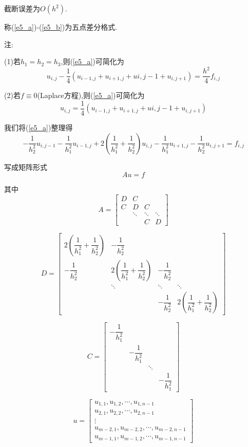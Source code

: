 \documentclass[withoutpreface,bwprint]{cumcmthesis} %
\begin{document}
截断误差为$O(h^2)$.

称(\ref{e5_a})-(\ref{e5_b})为五点差分格式.

注:

(1)若$h_1=h_2=h_3$,则(\ref{e5_a})可简化为
\begin{equation}
\label{e6}
u_{i,j}-\dfrac{1}{4}(u_{i-1,j}+u_{i+1,j}+u{i,j-1}+u_{i,j+1})=\dfrac{h^2}{4}f_{i,j}
\end{equation}

(2)若$f \equiv 0$(Laplace方程),则(\ref{e5_a})可简化为
\begin{equation}
\label{e7}
u_{i,j}=\dfrac{1}{4}(u_{i-1,j}+u_{i+1,j}+u{i,j-1}+u_{i,j+1})
\end{equation}

我们将(\ref{e5_a})整理得
\begin{equation}
\label{e8}
-\dfrac{1}{h_2^2}u_{i,j-1}-\dfrac{1}{h_1^2}u_{i-1,j}+2(\dfrac{1}{h_1^2}+\dfrac{1}{h_2^2})u_{i,j}-\dfrac{1}{h_1^2}u_{i+1,j}-\dfrac{1}{h_2^2}u_{i,j+1}=f_{i,j}
\end{equation}

写成矩阵形式
\begin{equation}
\label{e9}
Au=f
\end{equation}

其中
$$
A=
\begin{bmatrix}
D & C \\
C & D & C \\
& \ddots & \ddots & \ddots \\
& & 	C & D
\end{bmatrix}
$$


$$
D=
\begin{bmatrix}
2(\dfrac{1}{h_1^2}+\dfrac{1}{h_2^2}) & -\dfrac{1}{h_2^2} \\
-\dfrac{1}{h_2^2} & 2(\dfrac{1}{h_1^2}+\dfrac{1}{h_2^2}) & -\dfrac{1}{h_2^2} \\
& \ddots & \ddots & \ddots \\
& & 	-\dfrac{1}{h_2^2} & 2(\dfrac{1}{h_1^2}+\dfrac{1}{h_2^2})
\end{bmatrix}
$$

$$
C=
\begin{bmatrix}
-\dfrac{1}{h_1^2} &  \\
 & -\dfrac{1}{h_1^2} & \\
&  & \ddots &  \\
& & 	 & -\dfrac{1}{h_1^2}
\end{bmatrix}
$$

$$
u=
\begin{bmatrix}
u_{1,1},u_{1,2},\cdots,u_{1,n-1}\\
u_{2,1},u_{2,2},\cdots,u_{2,n-1}\\
\vdots\\
u_{m-2,1},u_{m-2,2},\cdots,u_{m-2,n-1}\\
u_{m-1,1},u_{m-1,2},\cdots,u_{m-1,n-1}
\end{bmatrix}
$$
\end{document}
